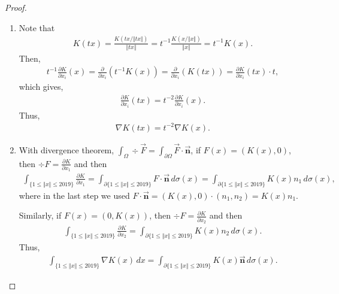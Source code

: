 \documentclass[12pt,leqno]{amsart}
\theoremstyle{definition}
\begin{document}
\begin{proof}
~\begin{enumerate}[label=(\alph*)]
    \item Note that 
    \begin{align*}
        K(tx) = \frac{K(tx/\Vert tx\Vert)}{\Vert tx\Vert} = t^{-1} \frac{K(x/\Vert x\Vert)}{\Vert x\Vert} = t^{-1} K(x).
    \end{align*}
    Then, 
    \begin{align*}
        t^{-1} \frac{\partial K}{\partial x_i}(x) = \frac{\partial }{\partial x_i}(t^{-1} K(x)) = \frac{\partial }{\partial x_i}(K(tx)) = \frac{\partial K}{\partial x_i}(tx) \cdot t,
    \end{align*}
    which gives,
    \begin{align*}
        \frac{\partial K}{\partial x_i}(tx) = t^{-2} \frac{\partial K}{\partial x_i}(x).
    \end{align*}
    Thus,
    \begin{align*}
        \nabla K(tx) = t^{-2} \nabla K(x).
    \end{align*}
    
    \item With divergence theorem, $\int_\Omega \div \vec{F} = \int_{\partial \Omega} \vec{F}\cdot \vec{\mathbf{n}}$, if $F(x) = (K(x), 0)$, then $\div F = \frac{\partial K}{\partial x_1}$ and then
    \begin{align*}
        \int_{\{1\leq \Vert x \Vert\leq 2019\}} \frac{\partial K}{\partial x_1} = \int_{\partial\{1\leq \Vert x \Vert\leq 2019\}} F \cdot \vec{\mathbf{n}} \, d\sigma(x) = \int_{\partial\{1\leq \Vert x \Vert\leq 2019\}} K(x) n_1 \, d\sigma(x),
    \end{align*}
    where in the last step we used $F \cdot \vec{\mathbf{n}} = (K(x), 0)\cdot (n_1, n_2) = K(x) n_1$.
    
    
    Similarly, if $F(x) = (0,K(x))$, then $\div F = \frac{\partial K}{\partial x_2}$ and then
    \begin{align*}
        \int_{\{1\leq \Vert x \Vert\leq 2019\}} \frac{\partial K}{\partial x_2} = \int_{\partial\{1\leq \Vert x \Vert\leq 2019\}} K(x) n_2 \, d\sigma(x).
    \end{align*}
    Thus, 
    \begin{align*}
        \int_{\{1\leq \Vert x\Vert\leq 2019\}} \nabla K(x)\, dx = \int_{\partial \{1\leq \Vert x\Vert\leq 2019\}} K(x)\vec{\mathbf{n}}\, d\sigma(x).
    \end{align*}
    

\end{enumerate}
\end{proof}
\end{document}
